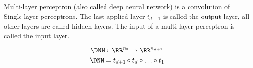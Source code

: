 \begin{definition}
Multi-layer perceptron (also called deep neural network)
is a convolution of Single-layer perceptrons.
The last applied layer $t_{d+1}$ is called the output layer,
all other layers are called hidden
layers. The input of a multi-layer perceptron is called the input layer.

\begin{equation*}
    \DNN: \, \RR^{n_0} \to \RR^{n_{d+1}}
\end{equation*}
\begin{equation*}
    \DNN = t_{d+1} \circ t_d \circ \ldots \circ t_1
\end{equation*}
\end{definition}

